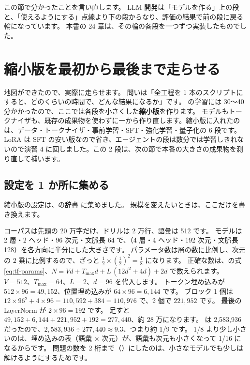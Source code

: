この節で分かったことを言い直します。
LLM 開発は「モデルを作る」上の段と、「使えるようにする」点線より下の段からなり、評価の結果で前の段に戻る輪になっています。
本書の 24 章は、その輪の各段を一つずつ実装したものでした。

\section{縮小版を最初から最後まで走らせる}\label{sec:cap-mini}

地図ができたので、実際に走らせます。
問いは「全工程を 1 本のスクリプトにすると、どのくらいの時間で、どんな結果になるか」です。
 の学習には 30〜40 分かかったので、ここでは各段を小さくした\textbf{縮小版}を作ります。
モデルもトークナイザも、既存の成果物を使わずに一から作り直します。縮小版に入れたのは、データ・トークナイザ・事前学習・SFT・強化学習・量子化の 6 段です。LoRA は SFT の安い版なので省き、エージェントの段は数分では学習しきれないので演習 4 に回しました。この 2 段は、次の節で本番の大きさの成果物を測り直して補います。

\subsection*{設定を 1 か所に集める}

縮小版の設定は、の辞書  に集めました。
規模を変えたいときは、ここだけを書き換えます。


コーパスは先頭の 20 万字だけ、ドリルは 2 万行、語彙は 512 です。
モデルは 2 層・2 ヘッド・96 次元・文脈長 64 で、（4 層・4 ヘッド・192 次元・文脈長 128）を各方向に半分にした大きさです。
パラメータ数は層の数に比例し、次元の 2 乗に比例するので、ざっと $\tfrac12 \times (\tfrac12)^2 = \tfrac18$ になります。
正確な数は、の式\eqref{eq:tf-params}、$N = Vd + T_{\max}d + L\,(12d^2+4d) + 2d$ で数えられます。
$V=512$、$T_{\max}=64$、$L=2$、$d=96$ を代入します。
トークン埋め込みが $512\times96=49{,}152$、位置埋め込みが $64\times96=6{,}144$ です。
ブロック 1 個は $12\times96^2+4\times96=110{,}592+384=110{,}976$ で、2 個で $221{,}952$ です。
最後の LayerNorm が $2\times96=192$ です。
足すと $49{,}152+6{,}144+221{,}952+192=277{,}440$、約 28 万になります。
 は 2,583,936 だったので、$2{,}583{,}936\div277{,}440\approx9.3$、つまり約 1/9 です。
1/8 より少し小さいのは、埋め込みの表（語彙 × 次元）が、語彙も次元も小さくなって 1/16 になるからです。
問題の数を 2 桁まで（）にしたのは、小さなモデルでも少しは解けるようにするためです。

